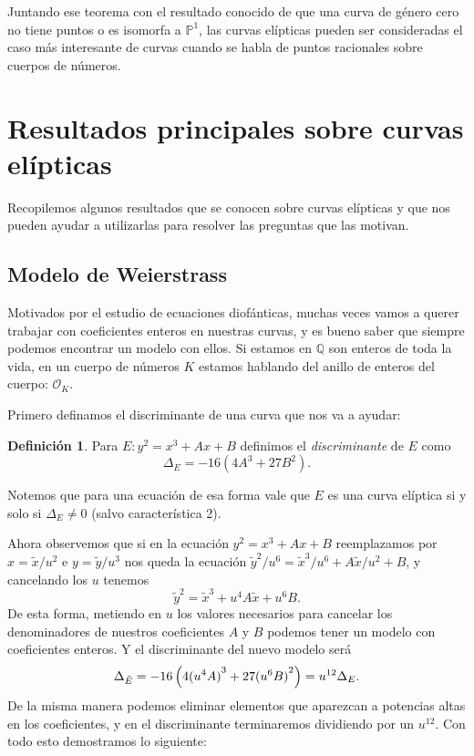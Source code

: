\documentclass[a4paper]{book}
\theoremstyle{definition}
\newtheorem*{definition*}{Definición}
\theoremstyle{plain}
\newcommand{\QQ}{\mathbb{Q}}
\newcommand{\PP}{\mathbb{P}}
\newcommand{\OO}{\mathcal{O}}
\newcommand{\lp}{\left\lparen}
\newcommand{\rp}{\right\rparen}
\begin{document}
Juntando ese teorema con el resultado conocido de que una curva de género cero no tiene puntos o es isomorfa a $\PP^1$, las curvas elípticas pueden ser consideradas el caso más interesante de curvas cuando se habla de puntos racionales sobre cuerpos de números.

\section{Resultados principales sobre curvas elípticas}

Recopilemos algunos resultados que se conocen sobre curvas elípticas y que nos pueden ayudar a utilizarlas para resolver las preguntas que las motivan. 

\subsection{Modelo de Weierstrass}

Motivados por el estudio de ecuaciones diofánticas, muchas veces vamos a querer trabajar con coeficientes enteros en nuestras curvas, y es bueno saber que siempre podemos encontrar un modelo con ellos. Si estamos en $\QQ$ son enteros de toda la vida, en un cuerpo de números $K$ estamos hablando del anillo de enteros del cuerpo: $\OO_K$.

Primero definamos el discriminante de una curva que nos va a ayudar:

\begin{definition*}
Para $E: y^2 = x^3+Ax+B$ definimos el \emph{discriminante} de $E$ como
\[
\Delta_E = -16(4A^3+27B^2).
\]
\end{definition*}

Notemos que para una ecuación de esa forma vale que $E$ es una curva elíptica si y solo si $\Delta_E \neq 0$ (salvo característica 2).

Ahora observemos que si en la ecuación $y^2 = x^3 +Ax+B$ reemplazamos por $x=\tilde{x}/u^2$ e $y=\tilde{y}/u^3$ nos queda la ecuación $\tilde{y}^2/u^6 = \tilde{x}^3/u^6  + A\tilde{x}/u^2 + B$, y cancelando los $u$ tenemos 
\[
\tilde{y}^2 = \tilde{x}^3 + u^4 A \tilde{x} + u^6 B.
\]
De esta forma, metiendo en $u$ los valores necesarios para cancelar los denominadores de nuestros coeficientes $A$ y $B$ podemos tener un modelo con coeficientes enteros. Y el discriminante del nuevo modelo será
\[
\Delta_{\tilde{E}} = -16 \lp 4{(u^4A)}^3+27{(u^6B)}^2 \rp = u^{12} \Delta_E.
\]
De la misma manera podemos eliminar elementos que aparezcan a potencias altas en los coeficientes, y en el discriminante terminaremos dividiendo por un $u^{12}$. Con todo esto demostramos lo siguiente:
\end{document}

